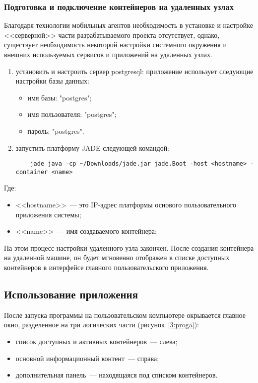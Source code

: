 \subsubsection{Подготовка и подключение контейнеров на удаленных узлах}
Благодаря технологии мобильных агентов необходимость в установке и настройке <<серверной>> части разрабатываемого проекта отсутствует, однако, существует необходимость некоторой настройки системного окружения и внешних используемых сервисов и приложений на удаленных узлах.
\begin{enumerate}
\item установить и настроить сервер postgresql: приложение использует следующие настройки базы данных:
    \begin{itemize}
        \item имя базы: "postgres";
        \item имя пользователя: "postgres";
        \item пароль: "postgres".
    \end{itemize}
\item запустить платформу JADE следующей командой:
    \begin{lstlisting}
    jade java -cp ~/Downloads/jade.jar jade.Boot -host <hostname> -container <name>
    \end{lstlisting}
\end{enumerate}
Где:
\begin{itemize}
    \item <<hostname>>~--- это IP-адрес платформы основого пользовательного приложения системы;
    \item <<name>>~--- имя создаваемого контейнера;
\end{itemize}
На этом процесс настройки удаленного узла закончен. После создания контейнера на удаленной машине, он будет мгновенно отображен в списке доступных контейнеров в интерфейсе главного пользовательского приложения.

\subsection{Использование приложения}
После запуска программы на пользовательском компьютере окрывается главное окно, разделенное на три логических части (рисунок~\ref{3:proga}):
\begin{itemize}
\item список доступных и активных контейнеров~--- слева;
\item основной информационный контент~--- справа;
\item дополнительная панель~--- находящаяся под списком контейнеров.
\end{itemize}

